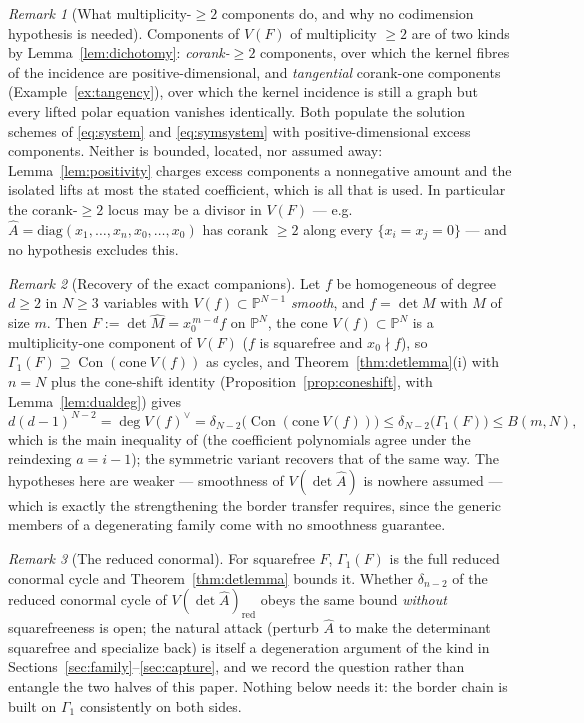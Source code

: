 \documentclass[acmsmall,screen,nonacm]{acmart}
\theoremstyle{definition}
\theoremstyle{remark}
\newtheorem{remark}{Remark}[section]
\DeclareMathOperator{\Con}{Con}
\newcommand{\PP}{\mathbb{P}}
\newcommand{\pdeg}{\delta}
\newcommand{\Gone}{\Gamma_{\!1}}
\begin{document}
\begin{remark}[What multiplicity-$\ge2$ components do, and why no
codimension hypothesis is needed]\label{rem:excess}
Components of $V(F)$ of multiplicity $\ge2$ are of two kinds by
Lemma~\ref{lem:dichotomy}: \emph{corank-$\ge2$} components, over which
the kernel fibres of the incidence are positive-dimensional, and
\emph{tangential} corank-one components (Example~\ref{ex:tangency}),
over which the kernel incidence is still a graph but every lifted
polar equation vanishes identically.  Both populate the solution
schemes of \eqref{eq:system} and \eqref{eq:symsystem} with
positive-dimensional excess components.  Neither is bounded, located,
nor assumed away: Lemma~\ref{lem:positivity} charges excess components
a nonnegative amount and the isolated lifts at most the stated
coefficient, which is all that is used.  In particular the
corank-$\ge2$ locus may be a divisor in $V(F)$ --- e.g.\
$\widehat A=\mathrm{diag}(x_1,\dots,x_n,x_0,\dots,x_0)$ has corank
$\ge2$ along every $\{x_i=x_j=0\}$ --- and no hypothesis excludes
this.
\end{remark}

\begin{remark}[Recovery of the exact companions]\label{rem:recover}
Let $f$ be homogeneous of degree $d\ge2$ in $N\ge3$ variables with
$V(f)\subset\PP^{N-1}$ \emph{smooth}, and $f=\det M$ with $M$ of size
$m$.  Then $F:=\det\widehat M=x_0^{\,m-d}f$ on $\PP^N$, the cone
$V(f)\subset\PP^N$ is a multiplicity-one component of $V(F)$ ($f$ is
squarefree and $x_0\nmid f$), so
$\Gone(F)\supseteq\Con(\mathrm{cone}\ V(f))$ as cycles, and
Theorem~\ref{thm:detlemma}(i) with $n=N$ plus the cone-shift identity
(Proposition~\ref{prop:coneshift}, with Lemma~\ref{lem:dualdeg})
gives
\[
  d(d-1)^{N-2}=\deg V(f)^\vee
  =\pdeg_{N-2}\big(\Con(\mathrm{cone}\ V(f))\big)
  \le\pdeg_{N-2}\big(\Gone(F)\big)\le B(m,N),
\]
which is the main inequality of \cite{SheshadriDC} (the coefficient
polynomials agree under the reindexing $a=i-1$); the symmetric variant
recovers that of \cite{SheshadriSDC} the same way.  The hypotheses
here are weaker --- smoothness of $V(\det\widehat A)$ is nowhere
assumed --- which is exactly the strengthening the border transfer
requires, since the generic members of a degenerating family come with
no smoothness guarantee.
\end{remark}

\begin{remark}[The reduced conormal]\label{rem:gammared}
For squarefree $F$, $\Gone(F)$ is the full reduced conormal cycle and
Theorem~\ref{thm:detlemma} bounds it.  Whether
$\pdeg_{n-2}$ of the reduced conormal cycle of $V(\det\widehat
A)_{\mathrm{red}}$ obeys the same bound \emph{without} squarefreeness
is open; the natural attack (perturb $\widehat A$ to make the
determinant squarefree and specialize back) is itself a degeneration
argument of the kind in Sections~\ref{sec:family}--\ref{sec:capture},
and we record the question rather than entangle the two halves of this
paper.  Nothing below needs it: the border chain is built on $\Gone$
consistently on both sides.
\end{remark}
\end{document}
